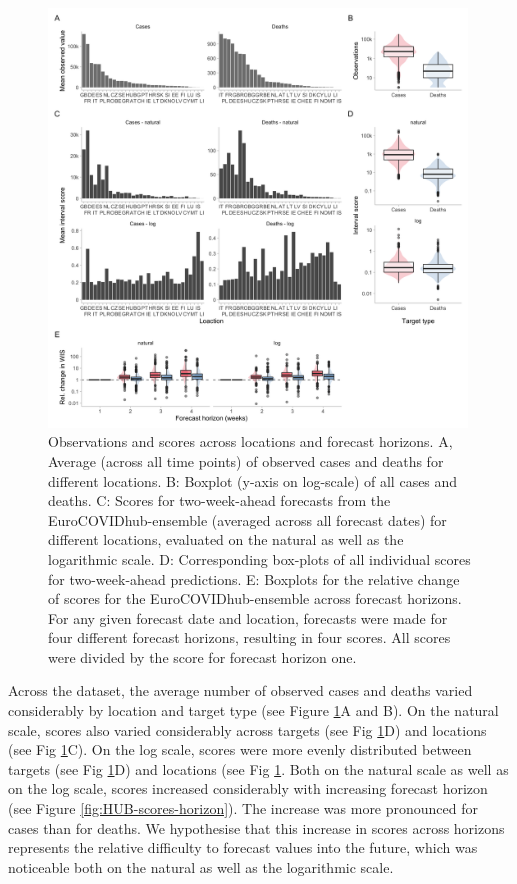 \documentclass{article}
\begin{document}
\begin{figure}[h!]
    \centering
    \includegraphics[width=0.99\textwidth]{output/figures/HUB-mean-obs-location.png}
    \caption{Observations and scores across locations and forecast horizons. A, Average (across all time points) of observed cases and deaths for different locations. B: Boxplot (y-axis on log-scale) of all cases and deaths. C: Scores for two-week-ahead forecasts from the EuroCOVIDhub-ensemble (averaged across all forecast dates) for different locations, evaluated on the natural as well as the logarithmic scale. D: Corresponding box-plots of all individual scores for two-week-ahead predictions. E: Boxplots for the relative change of scores for the EuroCOVIDhub-ensemble across forecast horizons. For any given forecast date and location, forecasts were made for four different forecast horizons, resulting in four scores. All scores were divided by the score for forecast horizon one.}
    \label{fig:HUB-mean-locations}
\end{figure}

Across the dataset, the average number of observed cases and deaths varied considerably by location and target type (see Figure \ref{fig:HUB-mean-locations}A and B). On the natural scale, scores also varied considerably across targets (see Fig \ref{fig:HUB-mean-locations}D) and locations (see Fig \ref{fig:HUB-mean-locations}C). On the log scale, scores were more evenly distributed between targets (see Fig \ref{fig:HUB-mean-locations}D) and locations (see Fig \ref{fig:HUB-mean-locations}. Both on the natural scale as well as on the log scale, scores increased considerably with increasing forecast horizon (see Figure \ref{fig:HUB-scores-horizon}). The increase was more pronounced for cases than for deaths. We hypothesise that this increase in scores across horizons represents the relative difficulty to forecast values into the future, which was noticeable both on the natural as well as the logarithmic scale. 
\end{document}
